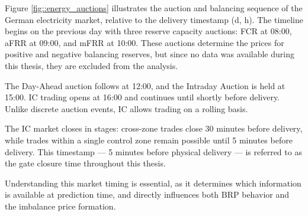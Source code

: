 \documentclass[class=scrbook, crop=false]{standalone}
\begin{document}
Figure \ref{fig::energy_auctions} illustrates the auction and balancing sequence of the German electricity market, relative to the delivery timestamp (d, h).
The timeline begins on the previous day with three reserve capacity auctions:  \gls{FCR} at 08:00, aFRR at 09:00, and  \gls{mFRR} at 10:00. These auctions determine the prices for positive and negative balancing reserves, but since no data was available during this thesis, they are excluded from the analysis.

The Day-Ahead auction follows at 12:00, and the Intraday Auction is held at 15:00.  \gls{IC} trading opens at 16:00 and continues until shortly before delivery. Unlike discrete auction events, \gls{IC} allows trading on a rolling basis.

The \gls{IC} market closes in stages: cross-zone trades close 30 minutes before delivery, while trades within a single control zone remain possible until 5 minutes before delivery. This timestamp — 5 minutes before physical delivery — is referred to as the gate closure time throughout this thesis.

Understanding this market timing is essential, as it determines which information is available at prediction time, and directly influences both \gls{BRP} behavior and the imbalance price formation.

 
 

\end{document}
